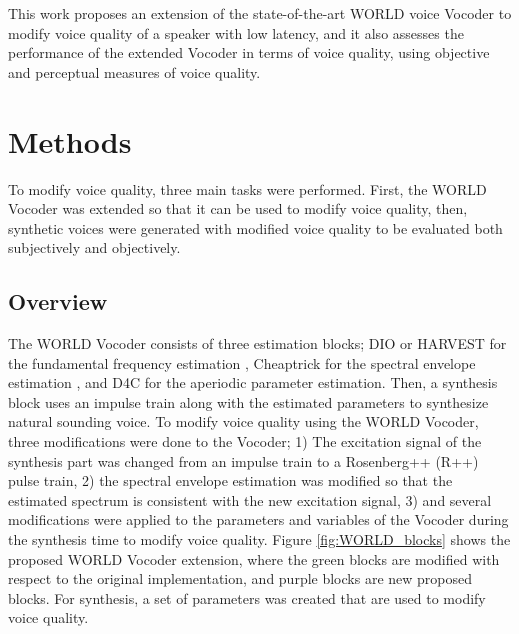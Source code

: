 \documentclass[final,5p,times,twocolumn]{elsarticle}
\begin{document}
This work proposes an extension of the state-of-the-art WORLD voice Vocoder to modify voice quality of a speaker with low latency, and it also assesses the performance of the extended Vocoder in terms of voice quality, using objective and perceptual measures of voice quality.

\section{Methods}

To modify voice quality, three main tasks were performed. First, the WORLD Vocoder was extended so that it can be used to modify voice quality, then, synthetic voices were generated with modified voice quality to be evaluated both subjectively and objectively.

\subsection{Overview}

The WORLD Vocoder consists of three estimation blocks; DIO or HARVEST for the fundamental frequency estimation \cite{morise2009dio}\cite{Morise_2017harvest}, Cheaptrick for the spectral envelope estimation \cite{Morise2015cheaptrick}, and D4C for the aperiodic parameter estimation\cite{Morise2016-2}. Then, a synthesis block uses an impulse train along with the estimated parameters to synthesize natural sounding voice. To modify voice quality using the WORLD Vocoder, three modifications were done to the Vocoder; 1) The excitation signal of the synthesis part was changed from an impulse train to a Rosenberg++ (R++) \cite{Veldhuis_1998}\cite{doval2006spectrum} pulse train, 2) the spectral envelope estimation was modified so that the estimated spectrum is consistent with the new excitation signal, 3) and several modifications were applied to the parameters and variables of the Vocoder during the synthesis time to modify voice quality. Figure \ref{fig:WORLD_blocks} shows the proposed WORLD Vocoder extension, where the green blocks are modified with respect to the original implementation, and purple blocks are new proposed blocks. For synthesis, a set of parameters was created that are used to modify voice quality.
 
\end{document}
